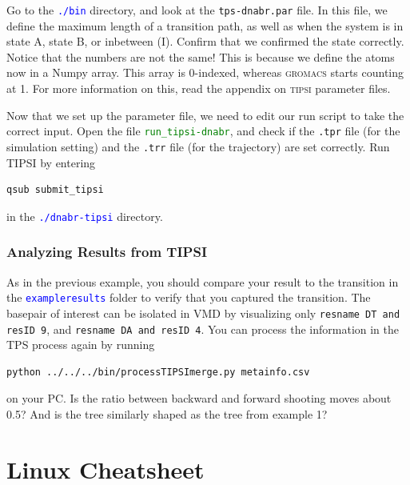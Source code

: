 \documentclass[]{article}
\begin{document}
Go to the \textcolor{blue}{\texttt{./bin}} directory, and look at the \texttt{tps-dnabr.par} file. In this file, we define the maximum length of a transition path, as well as when the system is in state A, state B, or inbetween (I). Confirm that we confirmed the state correctly. Notice that the numbers are not the same! This is because we define the atoms now in a Numpy array. This array is 0-indexed, whereas \textsc{gromacs} starts counting at 1. For more information on this, read the appendix on \textsc{tipsi} parameter files.

Now that we set up the parameter file, we need to edit our run script to take the correct input. Open the file \textcolor{green}{\texttt{run\_tipsi-dnabr}}, and check if the \texttt{.tpr} file (for the simulation setting) and the \texttt{.trr} file (for the trajectory) are set correctly. Run \textsc{TIPSI} by entering
%
\begin{lstlisting}
qsub submit_tipsi
\end{lstlisting}
%
in the \textcolor{blue}{\texttt{./dnabr-tipsi}} directory.

\subsubsection*{Analyzing Results from TIPSI}

As in the previous example, you should compare your result to the transition in the \textcolor{blue}{\texttt{exampleresults}} folder to verify that you captured the transition. The basepair of interest can be isolated in \textsc{VMD} by visualizing only \texttt{resname DT and resID 9}, and \texttt{resname DA and resID 4}. You can process the information in the TPS process again by running
%
\begin{lstlisting}
python ../../../bin/processTIPSImerge.py metainfo.csv
\end{lstlisting}
% 
on your PC. Is the ratio between backward and forward shooting moves about 0.5? And is the tree similarly shaped as the tree from example 1?

\newpage

\appendix
\section*{Linux Cheatsheet}
\setlength\parindent{0pt}
\end{document}
